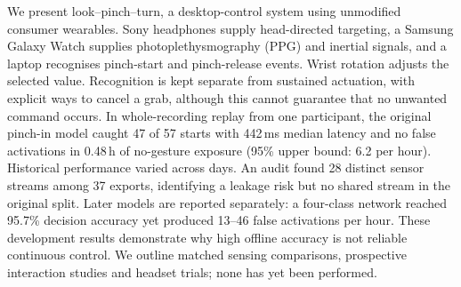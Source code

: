 We present look--pinch--turn, a desktop-control system using unmodified consumer wearables. Sony headphones supply head-directed targeting, a Samsung Galaxy Watch supplies photoplethysmography (PPG) and inertial signals, and a laptop recognises pinch-start and pinch-release events. Wrist rotation adjusts the selected value. Recognition is kept separate from sustained actuation, with explicit ways to cancel a grab, although this cannot guarantee that no unwanted command occurs. In whole-recording replay from one participant, the original pinch-in model caught 47 of 57 starts with 442\,ms median latency and no false activations in 0.48\,h of no-gesture exposure (95\% upper bound: 6.2 per hour). Historical performance varied across days. An audit found 28 distinct sensor streams among 37 exports, identifying a leakage risk but no shared stream in the original split. Later models are reported separately: a four-class network reached 95.7\% decision accuracy yet produced 13--46 false activations per hour. These development results demonstrate why high offline accuracy is not reliable continuous control. We outline matched sensing comparisons, prospective interaction studies and headset trials; none has yet been performed.
\fi

